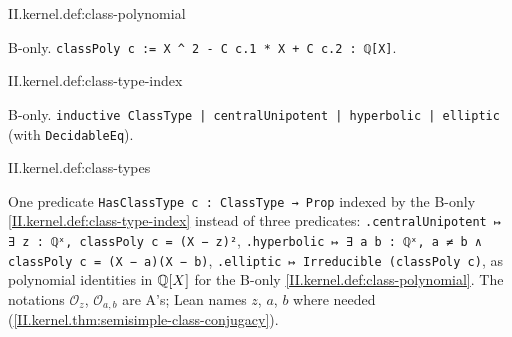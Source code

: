 \begin{definition}
\bonly
{}
\end{definition}
\begin{tfformal}{II.kernel.def:class-polynomial}
\begin{tffidelity}
B-only. \texttt{classPoly c := X \^{} 2 - C c.1 * X + C c.2 : ℚ[X]}.
\end{tffidelity}
\end{tfformal}

\begin{definition}
\bonly
{}
\end{definition}
\begin{tfformal}{II.kernel.def:class-type-index}
\begin{tffidelity}
B-only. \texttt{inductive ClassType | centralUnipotent | hyperbolic | elliptic} (with \texttt{DecidableEq}).
\end{tffidelity}
\end{tfformal}

\begin{definition}
\end{definition}
\begin{tfformal}{II.kernel.def:class-types}
\begin{tffidelity}
One predicate \texttt{HasClassType c : ClassType → Prop} indexed by the B-only \cref{II.kernel.def:class-type-index} instead of three predicates: \texttt{.centralUnipotent ↦ ∃ z : ℚˣ, classPoly c = (X − z)²}, \texttt{.hyperbolic ↦ ∃ a b : ℚˣ, a ≠ b ∧ classPoly c = (X − a)(X − b)}, \texttt{.elliptic ↦ Irreducible (classPoly c)}, as polynomial identities in $\mathbb{Q}[X]$ for the B-only \cref{II.kernel.def:class-polynomial}. The notations $\mathcal O_z$, $\mathcal O_{a,b}$ are A's; Lean names $z$, $a$, $b$ where needed (\cref{II.kernel.thm:semisimple-class-conjugacy}).
\end{tffidelity}
\end{tfformal}

